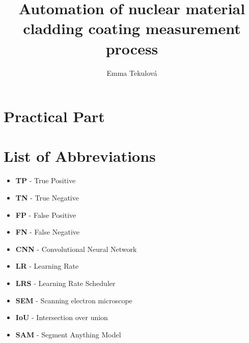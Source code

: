 \documentclass[12pt,a4paper]{report}
\title{Automation of nuclear material cladding coating measurement process }
\author{Emma Tekulová }
\begin{document}
\maketitle
\newpage




\renewcommand{\contentsname}{\vspace{-1.5cm}Contents}
\tableofcontents


\newpage




\chapter{Practical Part}











\newpage
\listoffigures
\newpage

\listoftables
\newpage

\chapter*{List of Abbreviations}
\begin{itemize}
    \item \textbf{TP} - True Positive
    \item \textbf{TN} - True Negative
    \item \textbf{FP} - False Positive
    \item \textbf{FN} - False Negative
    \item \textbf{CNN} - Convolutional Neural Network
    \item \textbf{LR} - Learning Rate
    \item \textbf{LRS} - Learning Rate Scheduler
    \item \textbf{SEM} - Scanning electron microscope
    \item \textbf{IoU} - Intersection over union
    \item \textbf{SAM} - Segment Anything Model
\end{itemize}
\end{document}
